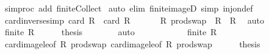 \begin{isabellebody}
\ {\isacharbrackleft}{\kern0pt}{\isacharbrackleft}{\kern0pt}simproc\ add{\isacharcolon}{\kern0pt}\ finite{\isacharunderscore}{\kern0pt}Collect{\isacharbrackright}{\kern0pt}{\isacharbrackright}{\kern0pt}\isanewline
{}\isamarkupfalse%
\ {\isacharparenleft}{\kern0pt}auto\ elim{\isacharcolon}{\kern0pt}\ finite{\isacharunderscore}{\kern0pt}imageD\ simp{\isacharcolon}{\kern0pt}\ inj{\isacharunderscore}{\kern0pt}on{\isacharunderscore}{\kern0pt}def{\isacharparenright}{\kern0pt}%
\endisatagproof
{\isafoldproof}%
%
\isadelimproof
\isanewline
%
\endisadelimproof
\isanewline
{}\isamarkupfalse%
\ card{\isacharunderscore}{\kern0pt}inverse{\isacharbrackleft}{\kern0pt}simp{\isacharbrackright}{\kern0pt}{\isacharcolon}{\kern0pt}\ {\isachardoublequoteopen}card\ {\isacharparenleft}{\kern0pt}R{\isasyminverse}{\isacharparenright}{\kern0pt}\ {\isacharequal}{\kern0pt}\ card\ R{\isachardoublequoteclose}\isanewline
%
\isadelimproof
%
\endisadelimproof
%
\isatagproof
{}\isamarkupfalse%
\ {\isacharminus}{\kern0pt}\isanewline
\ \ \isamarkupfalse%
\ {\isacharasterisk}{\kern0pt}{\isacharcolon}{\kern0pt}\ {\isachardoublequoteopen}{\isasymAnd}R{\isachardot}{\kern0pt}\ prod{\isachardot}{\kern0pt}swap\ {\isacharbackquote}{\kern0pt}\ R\ {\isacharequal}{\kern0pt}\ R{\isasyminverse}{\isachardoublequoteclose}\ \isamarkupfalse%
\ auto\isanewline
\ \ \isacommand{{\isacharbraceleft}{\kern0pt}}\isamarkupfalse%
\isanewline
\ \ \ \ \isamarkupfalse%
\ {\isachardoublequoteopen}{\isasymnot}finite\ R{\isachardoublequoteclose}\isanewline
\ \ \ \ \isamarkupfalse%
\ {\isacharquery}{\kern0pt}thesis\isanewline
\ \ \ \ \ \ \isamarkupfalse%
\ auto\isanewline
\ \ \isacommand{{\isacharbraceright}{\kern0pt}}\isamarkupfalse%
\ \isamarkupfalse%
\ \isacommand{{\isacharbraceleft}{\kern0pt}}\isamarkupfalse%
\isanewline
\ \ \ \ \isamarkupfalse%
\ {\isachardoublequoteopen}finite\ R{\isachardoublequoteclose}\isanewline
\ \ \ \ \isamarkupfalse%
\ card{\isacharunderscore}{\kern0pt}image{\isacharunderscore}{\kern0pt}le{\isacharbrackleft}{\kern0pt}of\ R\ prod{\isachardot}{\kern0pt}swap{\isacharbrackright}{\kern0pt}\ card{\isacharunderscore}{\kern0pt}image{\isacharunderscore}{\kern0pt}le{\isacharbrackleft}{\kern0pt}of\ {\isachardoublequoteopen}R{\isasyminverse}{\isachardoublequoteclose}\ prod{\isachardot}{\kern0pt}swap{\isacharbrackright}{\kern0pt}\isanewline
\ \ \ \ \isamarkupfalse%
\ {\isacharquery}{\kern0pt}thesis\ \isamarkupfalse%

\end{isabellebody}
